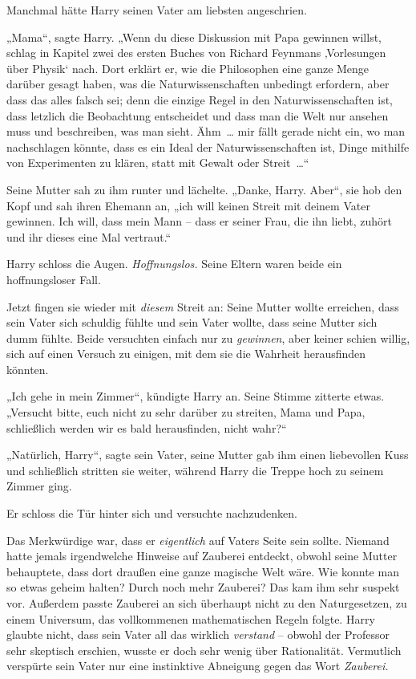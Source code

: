 Manchmal hätte Harry seinen Vater am liebsten angeschrien.

„Mama“, sagte Harry. „Wenn du diese Diskussion mit Papa gewinnen willst, schlag in Kapitel zwei des ersten Buches von Richard Feynmans ‚Vorlesungen über Physik‘ nach. Dort erklärt er, wie die Philosophen eine ganze Menge darüber gesagt haben, was die Naturwissenschaften unbedingt erfordern, aber dass das alles falsch sei; denn die einzige Regel in den Naturwissenschaften ist, dass letzlich die Beobachtung entscheidet und dass man die Welt nur ansehen muss und beschreiben, was man sieht. Ähm … mir fällt gerade nicht ein, wo man nachschlagen könnte, dass es ein Ideal der Naturwissenschaften ist, Dinge mithilfe von Experimenten zu klären, statt mit Gewalt oder Streit …“

Seine Mutter sah zu ihm runter und lächelte. „Danke, Harry. Aber“, sie hob den Kopf und sah ihren Ehemann an, „ich will keinen Streit mit deinem Vater gewinnen. Ich will, dass mein Mann – dass er seiner Frau, die ihn liebt, zuhört und ihr dieses eine Mal vertraut.“

Harry schloss die Augen. \emph{Hoffnungslos.} Seine Eltern waren beide ein hoffnungsloser Fall.

Jetzt fingen sie wieder mit \emph{diesem} Streit an: Seine Mutter wollte erreichen, dass sein Vater sich schuldig fühlte und sein Vater wollte, dass seine Mutter sich dumm fühlte. Beide versuchten einfach nur zu \emph{gewinnen}, aber keiner schien willig, sich auf einen Versuch zu einigen, mit dem sie die Wahrheit herausfinden könnten.

„Ich gehe in mein Zimmer“, kündigte Harry an. Seine Stimme zitterte etwas. „Versucht bitte, euch nicht zu sehr darüber zu streiten, Mama und Papa, schließlich werden wir es bald herausfinden, nicht wahr?“

„Natürlich, Harry“, sagte sein Vater, seine Mutter gab ihm einen liebevollen Kuss und schließlich stritten sie weiter, während Harry die Treppe hoch zu seinem Zimmer ging.

Er schloss die Tür hinter sich und versuchte nachzudenken.

Das Merkwürdige war, dass er \emph{eigentlich} auf Vaters Seite sein sollte. Niemand hatte jemals irgendwelche Hinweise auf Zauberei entdeckt, obwohl seine Mutter behauptete, dass dort draußen eine ganze magische Welt wäre. Wie konnte man so etwas geheim halten? Durch noch mehr Zauberei? Das kam ihm sehr suspekt vor. Außerdem passte Zauberei an sich überhaupt nicht zu den Naturgesetzen, zu einem Universum, das vollkommenen mathematischen Regeln folgte. Harry glaubte nicht, dass sein Vater all das wirklich \emph{verstand} – obwohl der Professor sehr skeptisch erschien, wusste er doch sehr wenig über Rationalität. Vermutlich verspürte sein Vater nur eine instinktive Abneigung gegen das Wort \emph{Zauberei.}

